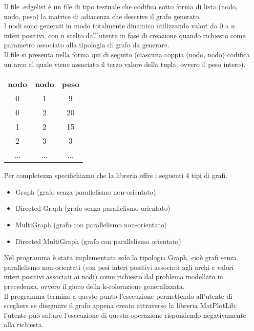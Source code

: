 Il file .edgelist è un file di tipo testuale che codifica sotto forma di lista (nodo, nodo, peso) la matrice di adiacenza che descrive il grafo generato.\\

I nodi sono generati in modo totalmente dinamico utilizzando valori da 0 a n interi positivi, con n scelto dall'utente in fase di creazione quando richiesto come parametro associato alla tipologia di grafo da generare.\\

Il file si presenta nella forma qui di seguito (ciascuna coppia (nodo, nodo) codifica un arco al quale viene associato il terzo valore della tupla, ovvero il peso intero).\\

\begin{table}[h]
\centering
\begin{tabular}{ccc}
\textbf{nodo} & \textbf{nodo} & \textbf{peso} \\
0 & 1 & 9 \\
0 & 2 & 20 \\
1 & 2 & 15 \\
2 & 3 & 3 \\
... & ... & ...
\end{tabular}
\end{table}

Per completezza specifichiamo che la libreria offre i seguenti 4 tipi di grafi.

\begin{itemize}
	\item Graph (grafo senza parallelismo non-orientato)
	\item Directed Graph (grafo senza parallelismo orientato)
	\item MultiGraph (grafo con parallelismo non-orientato)
	\item Directed MultiGraph (grafo con parallelismo orientato)
\end{itemize}

Nel programma è stata implementata solo la tipologia Graph, cioè grafi senza parallelismo non-orientati (con pesi interi positivi associati agli archi e valori interi positivi associati ai nodi) come richiesto dal problema modellato in precedenza, ovvero il gioco della k-colorazione generalizzata.\\

Il programma termina a questo punto l'esecuzione permettendo all'utente di scegliere se disegnare il grafo appena creato attraverso la libreria MatPlotLib, l'utente può saltare l'esecuzione di questa operazione rispondendo negativamente alla richiesta.\\

